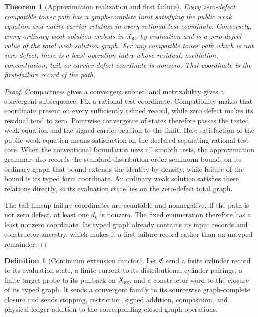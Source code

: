 \documentclass[11pt]{article}
\numberwithin{section}{part}
\theoremstyle{plain}
\newtheorem{theorem}{Theorem}[section]
\theoremstyle{definition}
\newtheorem{definition}[definition]{Definition}
\theoremstyle{remark}
\begin{document}
\begin{theorem}[Approximation realization and first failure]
\label{thm:approximation-realization-first-failure}
Every zero-defect compatible tower path has a graph-complete limit satisfying
the public weak equation and native carrier relation in every rational test
coordinate.  Conversely, every ordinary weak solution embeds in
\(X_{\rm gc}\) by evaluation and is a zero-defect value of the total weak
solution graph.  For any compatible tower path which is not zero defect,
there is a least operation index whose residual, oscillation,
concentration, tail, or carrier-defect coordinate is nonzero.  That coordinate
is the first-failure record of the path.
\end{theorem}

\begin{proof}
Compactness gives a convergent subnet, and metrizability gives a convergent
subsequence.  Fix a rational test coordinate.  Compatibility makes that
coordinate present on every sufficiently refined record, while zero defect
makes its residual tend to zero.  Pointwise convergence of states therefore
passes the tested weak equation and the signed carrier relation to the limit.
Here satisfaction of the public weak equation means satisfaction on the
declared separating rational test core.  When the conventional formulation
uses all smooth tests, the approximation grammar also records the standard
distribution-order seminorm bound; on its ordinary graph that bound extends
the identity by density, while failure of the bound is its typed form
coordinate.
An ordinary weak solution satisfies these relations directly, so its
evaluation state lies on the zero-defect total graph.

The tail-limsup failure coordinates are countable and nonnegative.  If the
path is not zero defect, at least one \(d_k\) is nonzero.  The fixed enumeration
therefore has a least nonzero coordinate.  Its typed graph already contains
its input records and constructor ancestry, which makes it a first-failure
record rather than an untyped remainder.
\end{proof}

\begin{definition}[Continuum extension functor]
\label{def:continuum-extension-functor}
Let \(\mathfrak C\) send a finite cylinder record to its evaluation state,
a finite current to its distributional cylinder pairings, a finite target
probe to its pullback on \(X_{\rm gc}\), and a constructor word to the closure
of its typed graph.  It sends a convergent family to its sourcewise
graph-complete closure and sends stopping, restriction, signed addition,
composition, and physical-ledger addition to the corresponding closed graph
operations.
\end{definition}
\end{document}
